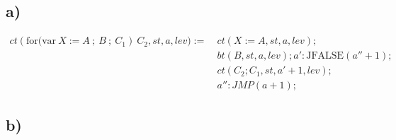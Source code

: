 \subsection*{a)}


\begin{equation*}
\begin{split}
ct(\text{for(var}\: X := A\:;\: B\:;\: C_1) \:C_2, st, a, lev) := \:& ct(X := A, st, a, lev); \\
		& bt(B, st, a, lev); a' : \text{JFALSE}(a'' + 1); \\
		& ct(C_2; C_1, st, a' + 1, lev); \\
		& a'': JMP(a + 1);
\end{split}
\end{equation*}

\subsection*{b)}

